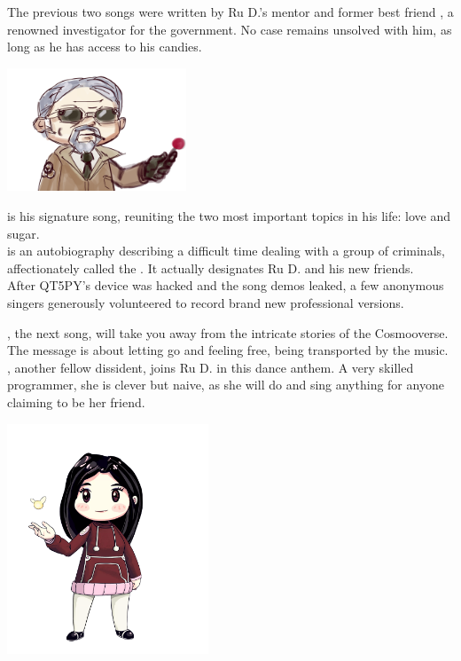 
The previous two songs were written by Ru D.'s mentor and former best friend , a renowned investigator for the government. No case remains unsolved with him, as long as he has access to his candies. 

\begin{center}
\includegraphics[width=0.40\textwidth]{Assets/qt5py}
\end{center}

 is his signature song, reuniting the two most important topics in his life: love and sugar.\\

 is an autobiography describing a difficult time dealing with a group of criminals, affectionately called the . It actually designates Ru D. and his new friends. \\

After QT5PY's device was hacked and the song demos leaked, a few anonymous singers generously volunteered to record brand new professional versions.

\clearpage

, the next song, will take you away from the intricate stories of the Cosmooverse. The message is about letting go and feeling free, being transported by the music.\\

, another fellow dissident, joins Ru D. in this dance anthem. A very skilled programmer, she is clever but naive, as she will do and sing anything for anyone claiming to be her friend. 

\begin{center}
\includegraphics[width=0.45\textwidth]{Assets/florrie}
\end{center}

\clearpage